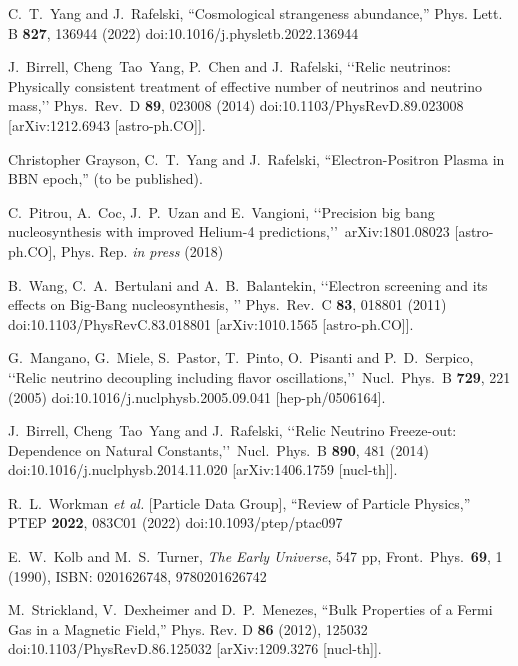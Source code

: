 \documentclass[universe,article,submit,moreauthors,pdftex,a4paper]{Definitions/mdpi}
\begin{document}
\begin{thebibliography}{99}
C.~T.~Yang and J.~Rafelski,
``Cosmological strangeness abundance,''
Phys. Lett. B \textbf{827}, 136944 (2022)
doi:10.1016/j.physletb.2022.136944

J.~Birrell, Cheng~Tao~Yang, P.~Chen and J.~Rafelski,
\lq\lq Relic neutrinos: Physically consistent treatment of effective number of neutrinos and neutrino mass,\rq\rq
Phys.\ Rev.\ D {\bf 89}, 023008 (2014)
doi:10.1103/PhysRevD.89.023008
[arXiv:1212.6943 [astro-ph.CO]].

Christopher Grayson, C.~T.~Yang and J.~Rafelski,
``Electron-Positron Plasma in BBN epoch,'' (to be published).

C.~Pitrou, A.~Coc, J.~P.~Uzan and E.~Vangioni,
\lq\lq Precision big bang nucleosynthesis with improved Helium-4 predictions,\rq\rq\ 
arXiv:1801.08023 [astro-ph.CO], Phys. Rep. {\it in press} (2018)


B.~Wang, C.~A.~Bertulani and A.~B.~Balantekin,
\lq\lq Electron screening and its effects on Big-Bang nucleosynthesis, \rq\rq
Phys.\ Rev.\ C {\bf 83}, 018801 (2011)
doi:10.1103/PhysRevC.83.018801
[arXiv:1010.1565 [astro-ph.CO]].

G.~Mangano, G.~Miele, S.~Pastor, T.~Pinto, O.~Pisanti and P.~D.~Serpico,
\lq\lq Relic neutrino decoupling including flavor oscillations,\rq\rq\
Nucl.\ Phys.\ B {\bf 729}, 221 (2005)
doi:10.1016/j.nuclphysb.2005.09.041
[hep-ph/0506164].

 J.~Birrell, Cheng~Tao~Yang and J.~Rafelski,
\lq\lq Relic Neutrino Freeze-out: Dependence on Natural Constants,\rq\rq\
 Nucl.\ Phys.\ B {\bf 890}, 481 (2014)
 doi:10.1016/j.nuclphysb.2014.11.020
 [arXiv:1406.1759 [nucl-th]].


R.~L.~Workman \textit{et al.} [Particle Data Group],
``Review of Particle Physics,''
PTEP \textbf{2022}, 083C01 (2022)
doi:10.1093/ptep/ptac097

E.~W.~Kolb and M.~S.~Turner,
\emph{The Early Universe},
547 pp, Front.\ Phys.\ {\bf 69}, 1 (1990),
ISBN: 0201626748, 9780201626742

M.~Strickland, V.~Dexheimer and D.~P.~Menezes,
``Bulk Properties of a Fermi Gas in a Magnetic Field,''
Phys. Rev. D \textbf{86} (2012), 125032
doi:10.1103/PhysRevD.86.125032
[arXiv:1209.3276 [nucl-th]].


\end{thebibliography}
\end{document}
